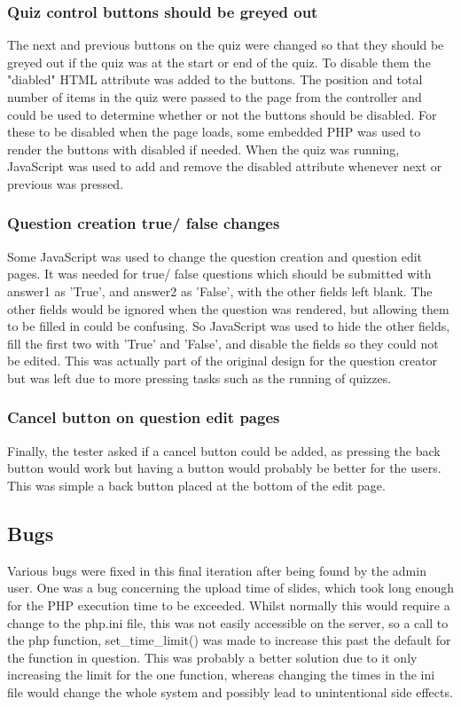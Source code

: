 \subsubsection{Quiz control buttons should be greyed out}
The next and previous buttons on the quiz were changed so that they should be greyed out if the quiz was at the start or end of the quiz. To disable them the "diabled" HTML attribute was added to the buttons. The position and total number of items in the quiz were passed to the page from the controller and could be used to determine whether or not the buttons should be disabled. For these to be disabled when the page loads, some embedded PHP was used to render the buttons with disabled if needed. When the quiz was running, JavaScript was used to add and remove the disabled attribute whenever next or previous was pressed.
\subsubsection{Question creation true/ false changes}
Some JavaScript was used to change the question creation and question edit pages. It was needed for true/ false questions which should be submitted with answer1 as 'True', and answer2 as 'False', with the other fields left blank. The other fields would be ignored when the question was rendered, but allowing them to be filled in could be confusing. So JavaScript was used to hide the other fields, fill the first two with 'True' and 'False', and disable the fields so they could not be edited. This was actually part of the original design for the question creator but was left due to more pressing tasks such as the running of quizzes.
\subsubsection{Cancel button on question edit pages}
Finally, the tester asked if a cancel button could be added, as pressing the back button would work but having a button would probably be better for the users. This was simple a back button placed at the bottom of the edit page.

\subsection{Bugs}
Various bugs were fixed in this final iteration after being found by the admin user. One was a bug concerning the upload time of slides, which took long enough for the PHP execution time to be exceeded. Whilst normally this would require a change to the php.ini file, this was not easily accessible on the server, so a call to the php function, set\_time\_limit() was made to increase this past the default for the function in question. This was probably a better solution due to it only increasing the limit for the one function, whereas changing the times in the ini file would change the whole system and possibly lead to unintentional side effects.

